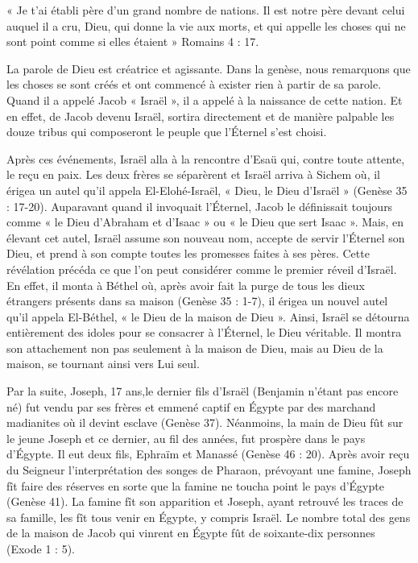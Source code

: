 « Je t'ai établi père d'un grand nombre de nations. Il est notre père devant celui auquel il a cru, Dieu, qui donne la vie aux morts, et qui appelle les choses qui ne sont point comme si elles étaient » Romains 4 : 17.

La parole de Dieu est créatrice et agissante. Dans la genèse, nous remarquons que les choses se sont créés et ont commencé à exister rien à partir de sa parole. Quand il a appelé Jacob « Israël », il a appelé à la naissance de cette nation. Et en effet, de Jacob devenu Israël, sortira directement et de manière palpable les douze tribus qui composeront le peuple que l’Éternel s'est choisi.

Après ces événements, Israël alla à la rencontre d'Esaü qui, contre toute attente, le reçu en paix. Les deux frères se séparèrent et Israël arriva à Sichem où, il érigea un autel qu'il appela El-Elohé-Israël, « Dieu, le Dieu d'Israël » (Genèse 35 : 17-20). Auparavant quand il invoquait l’Éternel, Jacob le définissait toujours comme « le Dieu d'Abraham et d'Isaac » ou « le Dieu que sert Isaac ». Mais, en élevant cet autel, Israël assume son nouveau nom, accepte de servir l’Éternel son Dieu, et prend à son compte toutes les promesses faites à ses pères. Cette révélation précéda ce que l'on peut considérer comme le premier réveil d'Israël. En effet, il monta à Béthel où, après avoir fait la purge de tous les dieux étrangers présents dans sa maison (Genèse 35 : 1-7), il érigea un nouvel autel qu'il appela El-Béthel, « le Dieu de la maison de Dieu ». Ainsi, Israël se détourna entièrement des idoles pour se consacrer à l’Éternel, le Dieu véritable. Il montra son attachement non pas seulement à la maison de Dieu, mais au Dieu de la maison, se tournant ainsi vers Lui seul.

Par la suite, Joseph, 17 ans,le dernier fils d'Israël (Benjamin n'étant pas encore né) fut vendu par ses frères et emmené captif en Égypte par des marchand madianites où il devint esclave (Genèse 37). Néanmoins, la main de Dieu fût sur le jeune Joseph et ce dernier, au fil des années, fut prospère dans le pays d’Égypte. Il eut deux fils, Ephraïm et Manassé (Genèse 46 : 20). Après avoir reçu du Seigneur l'interprétation des songes de Pharaon, prévoyant une famine, Joseph fît faire des réserves en sorte que la famine ne toucha point le pays d’Égypte (Genèse 41). La famine fît son apparition et Joseph, ayant retrouvé les traces de sa famille, les fît tous venir en Égypte, y compris Israël. Le nombre total des gens de la maison de Jacob qui vinrent en Égypte fût de soixante-dix personnes (Exode 1 : 5).

